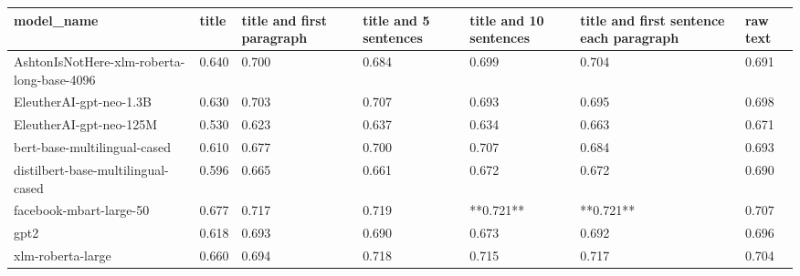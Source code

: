 \begin{tabular}{lllllll}
\toprule
                                model\_name & title & title and first paragraph & title and 5 sentences & title and 10 sentences & title and first sentence each paragraph & raw text \\
\midrule
AshtonIsNotHere-xlm-roberta-long-base-4096 & 0.640 &                     0.700 &                 0.684 &                  0.699 &                                   0.704 &    0.691 \\
                   EleutherAI-gpt-neo-1.3B & 0.630 &                     0.703 &                 0.707 &                  0.693 &                                   0.695 &    0.698 \\
                   EleutherAI-gpt-neo-125M & 0.530 &                     0.623 &                 0.637 &                  0.634 &                                   0.663 &    0.671 \\
              bert-base-multilingual-cased & 0.610 &                     0.677 &                 0.700 &                  0.707 &                                   0.684 &    0.693 \\
        distilbert-base-multilingual-cased & 0.596 &                     0.665 &                 0.661 &                  0.672 &                                   0.672 &    0.690 \\
                   facebook-mbart-large-50 & 0.677 &                     0.717 &                 0.719 &              **0.721** &                               **0.721** &    0.707 \\
                                      gpt2 & 0.618 &                     0.693 &                 0.690 &                  0.673 &                                   0.692 &    0.696 \\
                         xlm-roberta-large & 0.660 &                     0.694 &                 0.718 &                  0.715 &                                   0.717 &    0.704 \\
\bottomrule
\end{tabular}
